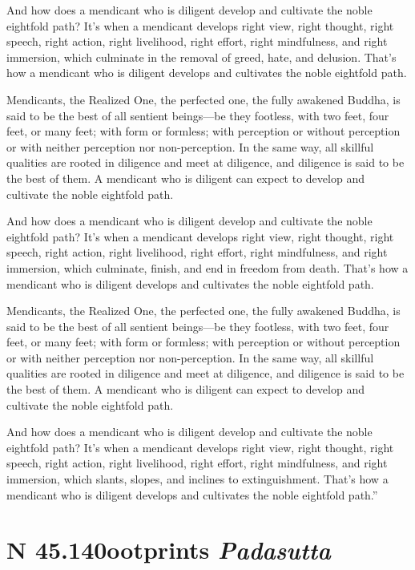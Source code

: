 \documentclass[12pt,openany]{book}%
\newcommand*{\suttatitleacronym}[1]{\smaller[2]{#1}\vspace*{.3em}}
\newcommand*{\suttatitletranslation}[1]{\linebreak{#1}}
\newcommand*{\suttatitleroot}[1]{\linebreak\smaller[2]\itshape{#1}}
\newcommand*{\tocacronym}[1]{\hspace*{-3.3em}{#1}\quad}
\newcommand*{\toctranslation}[1]{#1}
\newcommand*{\tocroot}[1]{(\textit{#1})}
\begin{document}
And how does a mendicant who is diligent develop and cultivate the noble eightfold path? It’s when a mendicant develops right view, right thought, right speech, right action, right livelihood, right effort, right mindfulness, and right immersion, which culminate in the removal of greed, hate, and delusion. That’s how a mendicant who is diligent develops and cultivates the noble eightfold path. 

Mendicants, the Realized One, the perfected one, the fully awakened Buddha, is said to be the best of all sentient beings—be they footless, with two feet, four feet, or many feet; with form or formless; with perception or without perception or with neither perception nor non-perception. In the same way, all skillful qualities are rooted in diligence and meet at diligence, and diligence is said to be the best of them. A mendicant who is diligent can expect to develop and cultivate the noble eightfold path. 

And how does a mendicant who is diligent develop and cultivate the noble eightfold path? It’s when a mendicant develops right view, right thought, right speech, right action, right livelihood, right effort, right mindfulness, and right immersion, which culminate, finish, and end in freedom from death. That’s how a mendicant who is diligent develops and cultivates the noble eightfold path. 

Mendicants, the Realized One, the perfected one, the fully awakened Buddha, is said to be the best of all sentient beings—be they footless, with two feet, four feet, or many feet; with form or formless; with perception or without perception or with neither perception nor non-perception. In the same way, all skillful qualities are rooted in diligence and meet at diligence, and diligence is said to be the best of them. A mendicant who is diligent can expect to develop and cultivate the noble eightfold path. 

And how does a mendicant who is diligent develop and cultivate the noble eightfold path? It’s when a mendicant develops right view, right thought, right speech, right action, right livelihood, right effort, right mindfulness, and right immersion, which slants, slopes, and inclines to extinguishment. That’s how a mendicant who is diligent develops and cultivates the noble eightfold path.” 

%
\section*{{\suttatitleacronym SN 45.140}{\suttatitletranslation Footprints }{\suttatitleroot Padasutta}}
\addcontentsline{toc}{section}{\tocacronym{SN 45.140} \toctranslation{Footprints } \tocroot{Padasutta}}
\end{document}
